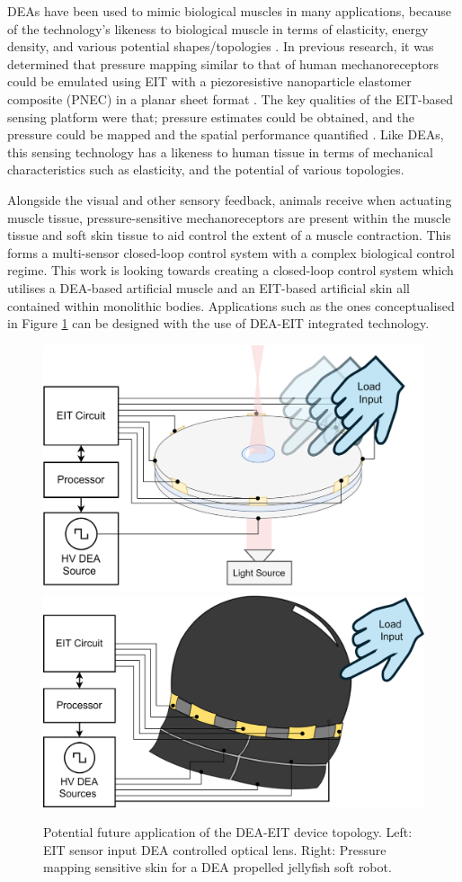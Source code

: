 DEAs have been used to mimic biological muscles in many applications, because of the technology's likeness to biological muscle in terms of elasticity, energy density, and various potential shapes/topologies \cite{Rosset2016, Hajiesmaili2021, Guo2021} . In previous research, it was determined that pressure mapping similar to that of human mechanoreceptors could be emulated using EIT with a piezoresistive nanoparticle elastomer composite (PNEC) in a planar sheet format\cite{Ellingham2022} . The key qualities of the EIT-based sensing platform were that; pressure estimates could be obtained, and the pressure could be mapped and the spatial performance quantified\cite{Ellingham2024} . Like DEAs, this sensing technology has a likeness to human tissue in terms of mechanical characteristics such as elasticity, and the potential of various topologies.

Alongside the visual and other sensory feedback, animals receive when actuating muscle tissue, pressure-sensitive mechanoreceptors are present within the muscle tissue and soft skin tissue to aid control the extent of a muscle contraction. This forms a multi-sensor closed-loop control system with a complex biological control regime. This work is looking towards creating a closed-loop control system which utilises a DEA-based artificial muscle and an EIT-based artificial skin all contained within monolithic bodies. Applications such as the ones conceptualised in Figure \ref{fig:dea-eit-applications} can be designed with the use of DEA-EIT integrated technology.

\begin{figure}[H]
	\centering
	\includegraphics[width=0.41\linewidth]{Figures/DEA-EIT_lens_application_lit.png}
	\hspace{1cm}
	\includegraphics[width=0.44\linewidth]{Figures/DEA-EIT_jellyfish_application.png}
	\vspace{0.3cm}
	\caption{Potential future application of the DEA-EIT device topology. Left: EIT sensor input DEA controlled optical lens. Right: Pressure mapping sensitive skin for a DEA propelled jellyfish soft robot.}
	\label{fig:dea-eit-applications}
\end{figure}


